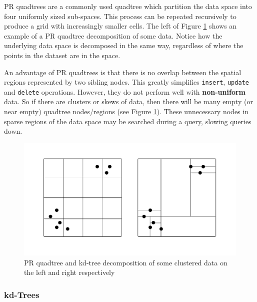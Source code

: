 PR quadtrees are a commonly used quadtree which partition the data space into four uniformly sized sub-spaces. This process can be repeated recursively to produce a grid with increasingly smaller cells. The left of Figure \ref{fig:quadtree-kdtree-clustered} shows an example of a PR quadtree decomposition of some data. Notice how the underlying data space is decomposed in the same way, regardless of where the points in the dataset are in the space.

An advantage of PR quadtrees is that there is no overlap between the spatial regions represented by two sibling nodes. This greatly simplifies \texttt{insert}, \texttt{update} and \texttt{delete} operations. However, they do not perform well with \textbf{non-uniform} data. So if there are clusters or skews of data, then there will be many empty (or near empty) quadtree nodes/regions (see Figure \ref{fig:quadtree-kdtree-clustered}). These unnecessary nodes in sparse regions of the data space may be searched during a query, slowing queries down.

\begin{figure}
	\vspace{-40pt}
	\begin{center}
		\includegraphics[scale=0.35]{figures/quadtrees_kdtrees_clustered.pdf}
	\end{center}
	\vspace{-30pt}
	\caption{PR quadtree and kd-tree decomposition of some clustered data on the left and right respectively}
	\label{fig:quadtree-kdtree-clustered}
\end{figure}

\subsubsection{kd-Trees}

